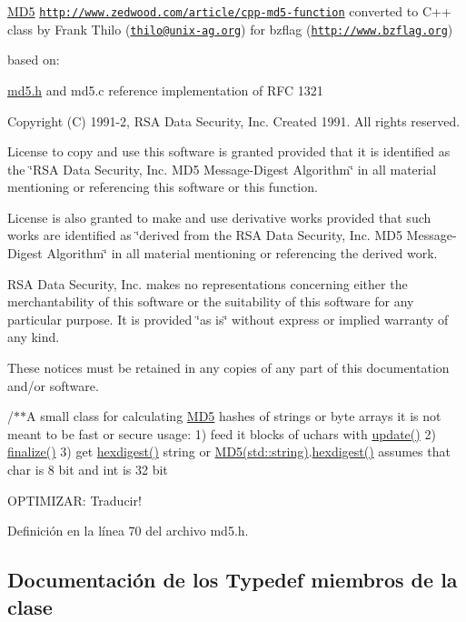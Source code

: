 \hyperlink{classMD5}{M\+D5} \href{http://www.zedwood.com/article/cpp-md5-function}{\tt http\+://www.\+zedwood.\+com/article/cpp-\/md5-\/function} converted to C++ class by Frank Thilo (\href{mailto:thilo@unix-ag.org}{\tt thilo@unix-\/ag.\+org}) for bzflag (\href{http://www.bzflag.org}{\tt http\+://www.\+bzflag.\+org})

based on\+:

\hyperlink{md5_8h}{md5.\+h} and md5.\+c reference implementation of R\+FC 1321

Copyright (C) 1991-\/2, R\+SA Data Security, Inc. Created 1991. All rights reserved.

License to copy and use this software is granted provided that it is identified as the \char`\"{}\+R\+S\+A Data Security, Inc. M\+D5 Message-\/\+Digest
\+Algorithm\char`\"{} in all material mentioning or referencing this software or this function.

License is also granted to make and use derivative works provided that such works are identified as \char`\"{}derived from the R\+S\+A Data
\+Security, Inc. M\+D5 Message-\/\+Digest Algorithm\char`\"{} in all material mentioning or referencing the derived work.

R\+SA Data Security, Inc. makes no representations concerning either the merchantability of this software or the suitability of this software for any particular purpose. It is provided \char`\"{}as is\char`\"{} without express or implied warranty of any kind.

These notices must be retained in any copies of any part of this documentation and/or software.

/$\ast$$\ast$A small class for calculating \hyperlink{classMD5}{M\+D5} hashes of strings or byte arrays it is not meant to be fast or secure usage\+: 1) feed it blocks of uchars with \hyperlink{classMD5_ac5ddf6cd8f940422396d321ea90ed045}{update()} 2) \hyperlink{classMD5_a10f607494a3f2e3e515fc4b99d1a06cc}{finalize()} 3) get \hyperlink{classMD5_aaf466f683b4bd8b1b66544f48bf09608}{hexdigest()} string or \hyperlink{classMD5}{M\+D5(std\+::string)}.\hyperlink{classMD5_aaf466f683b4bd8b1b66544f48bf09608}{hexdigest()} assumes that char is 8 bit and int is 32 bit

O\+P\+T\+I\+M\+I\+Z\+AR\+: Traducir! 

Definición en la línea 70 del archivo md5.\+h.



\subsection{Documentación de los \textquotesingle{}Typedef\textquotesingle{} miembros de la clase}
\hypertarget{classMD5_aa836972700679dbcff6ae8337f6db464}{}\label{classMD5_aa836972700679dbcff6ae8337f6db464} 
